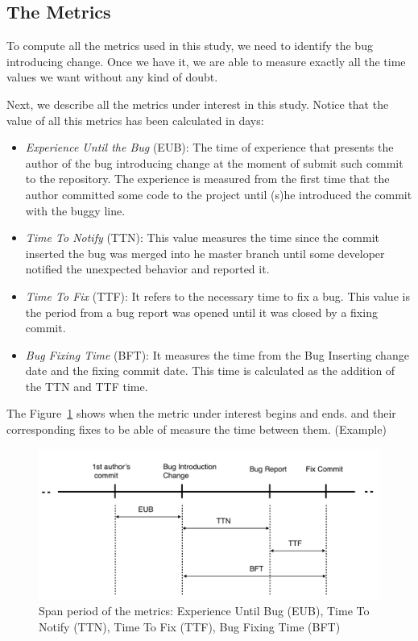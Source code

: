 \documentclass[10pt, conference]{IEEEtran}
\begin{document}
\subsection{The Metrics}
To compute all the metrics used in this study, we need to identify the bug introducing change. Once we have it, we are able to measure exactly all the time values we want without any kind of doubt.  

Next, we describe all the metrics under interest in this study. Notice that the value of all this metrics has been calculated in days: 
\begin{itemize}
		\item \emph{Experience Until the Bug} (EUB): The time of experience that presents the author of the bug introducing change at the moment of submit such commit to the repository. The experience is measured from the first time that the author committed some code to the project until (s)he introduced the commit with the buggy line.
		\item \emph{Time To Notify} (TTN): This value measures the time since the commit inserted the bug was merged into he master branch until some developer notified the unexpected behavior and reported it. 
		\item \emph{Time To Fix} (TTF): It refers to the necessary time to fix a bug. This value is the period from a bug report was opened until it was closed by a fixing commit.
		\item \emph{Bug Fixing Time} (BFT): It measures the time from the Bug Inserting change date and the fixing commit date. This time is calculated as the addition of the TTN and TTF time.
\end{itemize} 

The Figure~\ref{fig:metrics} shows when the metric under interest begins and ends. and their corresponding fixes to be able of measure the time between them. (Example)

\begin{figure}[ht]
\centering
\includegraphics[width=\columnwidth]{metrics.png}
\caption{ Span period of the metrics: Experience Until Bug (EUB),  Time To Notify (TTN), Time To Fix (TTF), Bug Fixing Time (BFT) }
\label{fig:metrics}       %
\end{figure}
\end{document}
